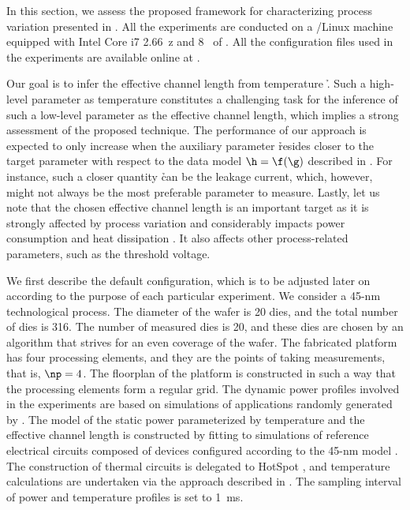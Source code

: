 In this section, we assess the proposed framework for characterizing process
variation presented in . All the experiments are conducted
on a /Linux machine equipped with Intel Core i7 2.66~z and
8~ of . All the configuration files used in the experiments are
available online at \cite{eslab2014a}.

Our goal is to infer the effective channel length \g from temperature \h. Such a
high-level parameter as temperature constitutes a challenging task for the
inference of such a low-level parameter as the effective channel length, which
implies a strong assessment of the proposed technique. The performance of our
approach is expected to only increase when the auxiliary parameter \h resides
closer to the target parameter \g with respect to the data model $\h = \f(\g)$
described in . For instance, such a closer quantity \h
can be the leakage current, which, however, might not always be the most
preferable parameter to measure. Lastly, let us note that the chosen effective
channel length is an important target as it is strongly affected by process
variation and considerably impacts power consumption and heat dissipation
\cite{chandrakasan2000, srivastava2010, juan2011, juan2012}. It also affects
other process-related parameters, such as the threshold voltage.

We first describe the default configuration, which is to be adjusted later on
according to the purpose of each particular experiment. We consider a 45-nm
technological process. The diameter of the wafer is 20 dies, and the total
number of dies \nd is 316. The number of measured dies \hnd is 20, and these
dies are chosen by an algorithm that strives for an even coverage of the wafer.
The fabricated platform has four processing elements, and they are the points of
taking measurements, that is, $\np = 4$. The floorplan of the platform is
constructed in such a way that the processing elements form a regular grid. The
dynamic power profiles involved in the experiments are based on simulations of
applications randomly generated by  \cite{dick1998}. The model of the
static power parameterized by temperature and the effective channel length is
constructed by fitting to  simulations of reference electrical
circuits composed of  devices \cite{bsim} configured according to the
45-nm   model \cite{ptm}. The construction of thermal 
circuits is delegated to HotSpot \cite{skadron2003}, and temperature
calculations are undertaken via the approach described in
. The sampling interval of power and temperature
profiles is set to 1~ms.

